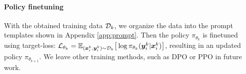 
\paragraph{Policy finetuning}
With the obtained training data ${\mathcal{D}}_k$, we organize the data into the prompt templates shown in Appendix \ref{app:prompt}. Then the policy $\pi_{\theta_k}$ is finetuned using target-loss: $\mathcal{L}_{\theta_k} = \mathbb{E}_{({\bm{x}}^k_i, {\bm{y}}^k_i) \sim {\mathcal{D}}_k} \big[\log \pi_{\theta_k}({\bm{y}}^k_i|{\bm{x}}^k_i) \big]$, resulting in an updated policy $\pi_{\theta_{k+1}}$. We leave other training methods, such as DPO \citep{rafailov2023direct} or PPO \citep{schulman2017proximal} in future work.
